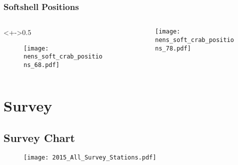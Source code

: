 
\begin{frame}
\frametitle{Softshell Positions}

\begin{columns}
\begin{column}<+->{0.5\textwidth}
 \vspace*{-0.5cm}
\begin{figure}
\centerline{\texttt{[image: nens\_soft\_crab\_positions\_68.pdf]}}

\end{figure}
\end{column}

\begin{column}{0.5\textwidth}
\begin{figure}
 \vspace*{-0.5cm}

\centerline{\texttt{[image: nens\_soft\_crab\_positions\_78.pdf]}}

 \end{figure}

\end{column}
\end{columns}


\end{frame}


\section{Survey}
\subsection{Survey Chart}

\begin{frame}

\begin{figure}

 \vspace*{-1.8cm}
 \centerline{\texttt{[image: 2015\_All\_Survey\_Stations.pdf]}}

 \end{figure}
\end{frame}


